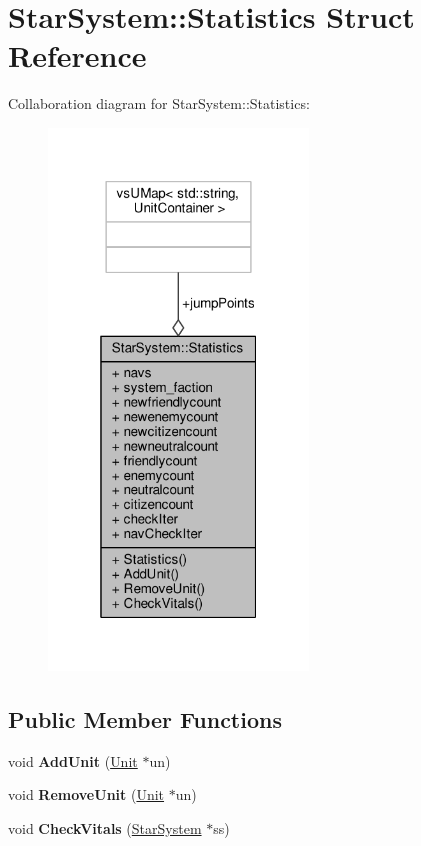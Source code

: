 \hypertarget{structStarSystem_1_1Statistics}{}\section{Star\+System\+:\+:Statistics Struct Reference}
\label{structStarSystem_1_1Statistics}


Collaboration diagram for Star\+System\+:\+:Statistics\+:
\nopagebreak
\begin{figure}[H]
\begin{center}
\leavevmode
\includegraphics[width=196pt]{d3/d4b/structStarSystem_1_1Statistics__coll__graph}
\end{center}
\end{figure}
\subsection*{Public Member Functions}
\begin{DoxyCompactItemize}
\item 
void {\bfseries Add\+Unit} (\hyperlink{classUnit}{Unit} $\ast$un)\hypertarget{structStarSystem_1_1Statistics_aadfc8fbf35c6d7cbf427f705ab50f217}{}\label{structStarSystem_1_1Statistics_aadfc8fbf35c6d7cbf427f705ab50f217}

\item 
void {\bfseries Remove\+Unit} (\hyperlink{classUnit}{Unit} $\ast$un)\hypertarget{structStarSystem_1_1Statistics_afd54aa7c17a4406cb9d2b9e7f29bd253}{}\label{structStarSystem_1_1Statistics_afd54aa7c17a4406cb9d2b9e7f29bd253}

\item 
void {\bfseries Check\+Vitals} (\hyperlink{classStarSystem}{Star\+System} $\ast$ss)\hypertarget{structStarSystem_1_1Statistics_ac7b6543a520507a03884f1e3e6c4543a}{}\label{structStarSystem_1_1Statistics_ac7b6543a520507a03884f1e3e6c4543a}

\end{DoxyCompactItemize}
